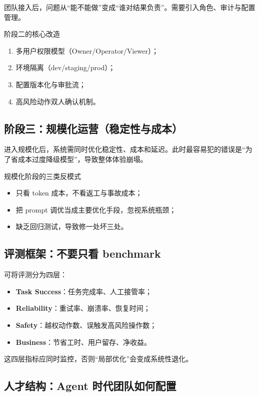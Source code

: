 \documentclass[a4paper]{article}
\begin{document}
团队接入后，问题从“能不能做”变成“谁对结果负责”。需要引入角色、审计与配置管理。

\begin{importantbox}{阶段二的核心改造}
\begin{enumerate}
    \item 多用户权限模型（Owner/Operator/Viewer）；
    \item 环境隔离（dev/staging/prod）；
    \item 配置版本化与审批流；
    \item 高风险动作双人确认机制。
\end{enumerate}
\end{importantbox}

\subsection{阶段三：规模化运营（稳定性与成本）}

进入规模化后，系统需同时优化稳定性、成本和延迟。此时最容易犯的错误是“为了省成本过度降级模型”，导致整体体验崩塌。

\begin{warningbox}{规模化阶段的三类反模式}
\begin{itemize}
    \item 只看 token 成本，不看返工与事故成本；
    \item 把 prompt 调优当成主要优化手段，忽视系统瓶颈；
    \item 缺乏回归测试，导致修一处坏三处。
\end{itemize}
\end{warningbox}

\subsection{评测框架：不要只看 benchmark}

可将评测分为四层：
\begin{itemize}
    \item \textbf{Task Success}：任务完成率、人工接管率；
    \item \textbf{Reliability}：重试率、崩溃率、恢复时间；
    \item \textbf{Safety}：越权动作数、误触发高风险操作数；
    \item \textbf{Business}：节省工时、用户留存、净收益。
\end{itemize}

这四层指标应同时监控，否则“局部优化”会变成系统性退化。

\subsection{人才结构：Agent 时代团队如何配置}
\end{document}
